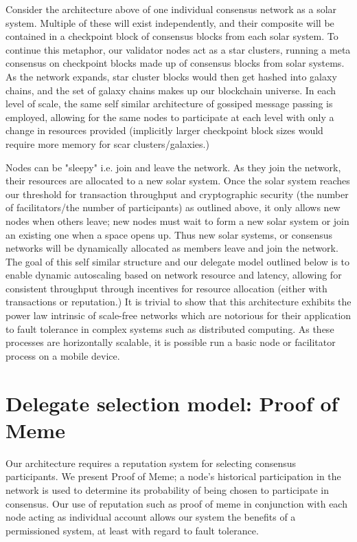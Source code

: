 \documentclass{article}
\begin{document}
Consider the architecture above of one individual consensus network as a solar system. Multiple of these will exist independently, and their composite will be contained in a checkpoint block of consensus blocks from each solar system. To continue this metaphor, our validator nodes act as a star clusters, running a meta consensus on checkpoint blocks made up of  consensus blocks from solar systems. As the network expands, star cluster blocks would then get hashed into galaxy chains, and the set of galaxy chains makes up our blockchain universe. In each level of scale, the same self similar architecture of gossiped message passing is employed, allowing for the same nodes to participate at each level with only a change in resources provided (implicitly larger checkpoint block sizes would require more memory for scar clusters/galaxies.)

Nodes can be "sleepy" i.e. join and leave the network. As they join the network, their resources are allocated to a new solar system. Once the solar system reaches our threshold for transaction throughput and cryptographic security (the number of facilitators/the number of participants) as outlined above, it only allows new nodes when others leave; new nodes must wait to form a new solar system or join an existing one when a space opens up. Thus new solar systems, or consensus networks will be dynamically allocated as members leave and join the network. The goal of this self similar structure and our delegate model outlined below is to enable dynamic autoscaling based on network resource and latency, allowing for consistent throughput through incentives for resource allocation (either with transactions or reputation.) It is trivial to show that this architecture exhibits the power law intrinsic of scale-free networks which are notorious for their application to fault tolerance in complex systems such as distributed computing. As these processes are horizontally scalable, it is possible run a basic node or facilitator process on a mobile device. 

\section{Delegate selection model: Proof of Meme}
Our architecture requires a reputation system for selecting consensus participants. We present Proof of Meme; a node's historical participation in the network is used to determine its probability of being chosen to participate in consensus. Our use of reputation such as proof of meme in conjunction with each node acting as individual account allows our system the benefits of a permissioned system, at least with regard to fault tolerance.
\end{document}
